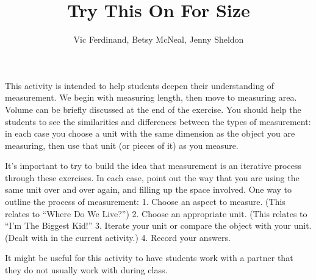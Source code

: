 \documentclass[handout]{ximera}
\title{Try This On For Size}
\author{Vic Ferdinand, Betsy McNeal, Jenny Sheldon}
\begin{document}
\begin{abstract}
\end{abstract}
\maketitle

\begin{instructorIntro}
This activity is intended to help students deepen their understanding of measurement.  We begin with measuring length, then move to measuring area.  Volume can be briefly discussed at the end of the exercise.  You should help the students to see the similarities and differences between the types of measurement: in each case you choose a unit with the same dimension as the object you are measuring, then use that unit (or pieces of it) as you measure.  

It's important to try to build the idea that measurement is an iterative process through these exercises. In each case, point out the way that you are using the same unit over and over again, and filling up the space involved.  One way to outline the process of measurement: 1.  Choose an aspect to measure. (This relates to ``Where Do We Live?'')  2. Choose an appropriate unit.  (This relates to ``I'm The Biggest Kid!''   3.  Iterate your unit or compare the object with your unit.  (Dealt with in the current activity.)  4.  Record your answers.

It might be useful for this activity to have students work with a partner that they do not usually work with during class.


\end{instructorIntro}
\end{document}
